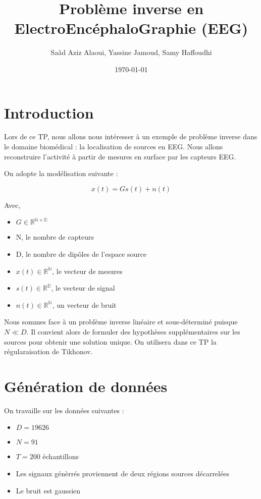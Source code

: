 \documentclass[12pt,a4paper,titlepage]{article}
\title{Problème inverse en ElectroEncéphaloGraphie (EEG)}
\author{Saâd Aziz Alaoui, Yassine Jamoud, Samy Haffoudhi}
\date{\today}
\begin{document}
\maketitle

\section*{Introduction}


Lors de ce TP, nous allons nous intéresser à un exemple de problème
inverse dans le domaine biomédical : la localisation de sources en EEG.
Nous allons reconstruire l'activité à partir de mesures en surface par
les capteurs EEG.

On adopte la modélisation suivante :

$$ x(t) = G s(t) + n(t) $$

Avec,

\begin{itemize}
    \item{$ G \in \mathbb{R^{N \times D}} $}
    \item{N, le nombre de capteurs}
    \item{D, le nombre de dipôles de l'espace source}
    \item{$ x(t) \in \mathbb{R^N} $, le vecteur de mesures}
    \item{$ s(t) \in \mathbb{R^D} $, le vecteur de signal}
    \item{$ n(t) \in \mathbb{R^N} $, un vecteur de bruit}
\end{itemize}

Nous sommes face à un problème inverse linéaire et sous-déterminé
puisque $N \ll D$. Il convient alors de formuler des hypothèses
supplémentaires sur les sources pour obtenir une solution unique.
On utilisera dans ce TP la régularaisation de Tikhonov.

\section{Génération de données}

On travaille sur les données suivantes :

\begin{itemize}
    \item{$ D = 19626 $}
    \item{$ N = 91 $}
    \item{$ T = 200 $ échantillons}
    \item{Les signaux génèrrés proviennent de deux régions sources décarrelées}
    \item{Le bruit est gaussien}
\end{itemize}
\end{document}
